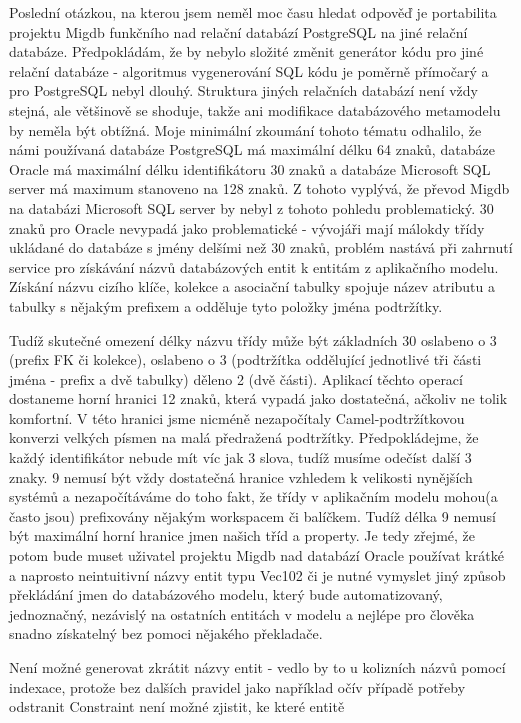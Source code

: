 \documentclass[11pt,twoside,a4paper]{book}
\begin{document}
Poslední otázkou, na kterou jsem neměl moc času hledat odpověď je portabilita
projektu Migdb funkčního nad relační databází PostgreSQL na jiné
relační databáze. Předpokládám, že by nebylo složité změnit generátor kódu
pro jiné relační databáze - algoritmus vygenerování SQL kódu je poměrně
přímočarý a pro PostgreSQL nebyl dlouhý. Struktura jiných relačních databází
není vždy stejná, ale většinově se shoduje, takže ani modifikace databázového
metamodelu by neměla být obtížná. Moje minimální zkoumání tohoto tématu
odhalilo, že námi používaná databáze PostgreSQL má maximální délku 64 znaků, 
databáze Oracle má maximální délku identifikátoru 30 znaků a databáze Microsoft 
SQL server má maximum stanoveno na 128 znaků. Z tohoto vyplývá, že převod Migdb 
na databázi Microsoft SQL server by nebyl  z tohoto pohledu problematický.
30 znaků pro Oracle nevypadá jako problematické - vývojáři mají málokdy třídy
ukládané do databáze s jmény delšími než 30 znaků, problém nastává při zahrnutí
service pro získávání názvů databázových entit k entitám z aplikačního modelu.
Získání názvu cizího klíče, kolekce a asociační tabulky spojuje název atributu a
tabulky s nějakým prefixem a odděluje tyto položky jména podtržítky. 

Tudíž skutečné omezení délky názvu třídy může být základních 30 oslabeno o 3
(prefix FK či kolekce), oslabeno o 3 (podtržítka oddělující jednotlivé tři
části jména - prefix a dvě tabulky) děleno 2 (dvě části). Aplikací těchto
operací dostaneme horní hranici 12 znaků, která vypadá jako dostatečná, ačkoliv 
ne tolik komfortní. V této hranici jsme nicméně nezapočítaly Camel-podtržítkovou
konverzi velkých písmen na malá předražená podtržítky. Předpokládejme, že každý
identifikátor nebude mít víc jak 3 slova, tudíž musíme odečíst další 3 znaky. 9
nemusí být vždy dostatečná hranice vzhledem k velikosti nynějších systémů a
nezapočítáváme do toho fakt, že třídy v aplikačním modelu mohou(a často jsou)
prefixovány nějakým workspacem či balíčkem. Tudíž délka 9 nemusí být maximální
horní hranice jmen našich tříd a property. Je tedy zřejmé, že potom bude muset
uživatel projektu Migdb nad databází Oracle používat krátké a naprosto
neintuitivní názvy entit typu Vec102 či je nutné vymyslet jiný způsob překládání
jmen do databázového modelu, který bude automatizovaný, jednoznačný, nezávislý
na ostatních entitách v modelu a nejlépe pro člověka snadno získatelný bez
pomoci nějakého překladače.

Není možné generovat zkrátit názvy entit - vedlo by to u kolizních názvů pomocí
indexace, protože bez dalších pravidel jako například očív případě potřeby
odstranit Constraint není možné zjistit, ke které entitě
\end{document}
